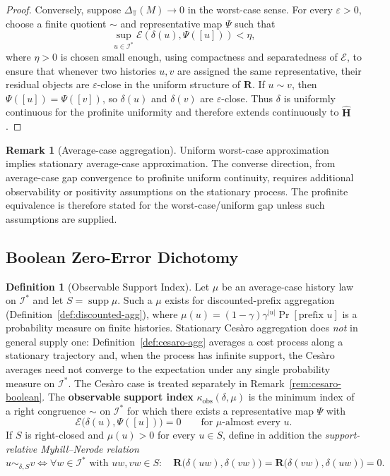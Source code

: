 \documentclass[12pt]{article}
\theoremstyle{definition}
\newtheorem{definition}[theorem]{Definition}
\newtheorem{remark}[theorem]{Remark}
\begin{document}
\begin{proof}
Conversely, suppose $\Delta_{\mathbb T}(M)\to0$ in the worst-case sense.  For
every $\varepsilon>0$, choose a finite quotient $\sim$ and representative map
$\Psi$ such that
\[
\sup_{u\in\mathcal I^*}
\mathcal E(\delta(u),\Psi([u]))
<
\eta,
\]
where $\eta>0$ is chosen small enough, using compactness and separatedness of
$\mathcal E$, to ensure that whenever two histories $u,v$ are assigned the same
representative, their residual objects are $\varepsilon$-close in the uniform
structure of $\mathbf R$.  If $u\sim v$, then $\Psi([u])=\Psi([v])$, so
$\delta(u)$ and $\delta(v)$ are $\varepsilon$-close.  Thus $\delta$ is
uniformly continuous for the profinite uniformity and therefore extends
continuously to $\widehat{\mathbf H}$.
\end{proof}

\begin{remark}[Average-case aggregation]
\label{rem:average-profinite}
Uniform worst-case approximation implies stationary average-case
approximation.  The converse direction, from average-case gap convergence to
profinite uniform continuity, requires additional observability or positivity
assumptions on the stationary process.  The profinite equivalence is therefore
stated for the worst-case/uniform gap unless such assumptions are supplied.
\end{remark}

\subsection{Boolean Zero-Error Dichotomy}
\label{subsec:meta-boolean}

\begin{definition}[Observable Support Index]
\label{def:observable-support-index}
Let $\mu$ be an average-case history law on $\mathcal I^*$ and let
$S=\operatorname{supp}\mu$.  Such a $\mu$ exists for discounted-prefix
aggregation (Definition~\ref{def:discounted-agg}), where
$\mu(u)=(1-\gamma)\gamma^{|u|}\Pr[\text{prefix }u]$ is a probability measure on
finite histories.  Stationary Ces\`aro aggregation does \emph{not} in general
supply one: Definition~\ref{def:cesaro-agg} averages a cost process along a
stationary trajectory and, when the process has infinite support, the Ces\`aro
averages need not converge to the expectation under any single probability
measure on $\mathcal I^*$.  The Ces\`aro case is treated separately in
Remark~\ref{rem:cesaro-boolean}.
The \textbf{observable support index} $\kappa_{\mathrm{obs}}(\delta,\mu)$ is
the minimum index of a right congruence $\sim$ on $\mathcal I^*$ for which
there exists a representative map $\Psi$ with
\[
\mathcal E\bigl(\delta(u),\Psi([u])\bigr)=0
\qquad
\text{for }\mu\text{-almost every }u .
\]
If $S$ is right-closed and $\mu(u)>0$ for every $u\in S$, define in addition
the \emph{support-relative Myhill--Nerode relation}
\[
u\sim_{\delta,S}v
\iff
\forall w\in\mathcal I^*\text{ with }uw,vw\in S:\quad
\mathbf R\bigl(\delta(uw),\delta(vw)\bigr)
=
\mathbf R\bigl(\delta(vw),\delta(uw)\bigr)
=
0 .
\]
\end{definition}
\end{document}

